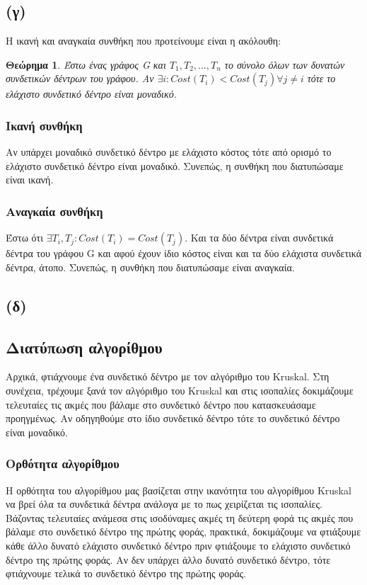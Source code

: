\documentclass[a4paper,oneside, 11pt]{article}
\newtheorem{theorem}{Θεώρημα}
\begin{document}
\subsection{(γ)}
Η ικανή και αναγκαία συνθήκη που προτείνουμε είναι η ακόλουθη:
\begin{theorem}
Έστω ένας γράφος G και $T_1, T_2, ..., T_n$ το σύνολο όλων των δυνατών συνδετικών δέντρων του γράφου. Αν 
$\exists i: Cost(T_i) < Cost(T_j) \forall j \neq i$ τότε το ελάχιστο συνδετικό δέντρο είναι μοναδικό.
\end{theorem}

\subsubsection{Ικανή συνθήκη}
Αν υπάρχει μοναδικό συνδετικό δέντρο με ελάχιστο κόστος τότε από ορισμό το ελάχιστο συνδετικό δέντρο είναι μοναδικό.  Συνεπώς, η συνθήκη που διατυπώσαμε είναι ικανή.

\subsubsection{Αναγκαία συνθήκη}
Έστω ότι $\exists T_i, T_j : Cost(T_i) = Cost(T_j)$. Και τα δύο δέντρα είναι συνδετικά δέντρα του γράφου G και αφού έχουν ίδιο κόστος είναι και τα δύο ελάχιστα συνδετικά δέντρα, άτοπο. Συνεπώς, η συνθήκη που διατυπώσαμε είναι αναγκαία.

\subsection{(δ)}
\subsection{Διατύπωση αλγορίθμου}
Αρχικά, φτιάχνουμε ένα συνδετικό δέντρο με τον αλγόριθμο του Kruskal. Στη συνέχεια, τρέχουμε ξανά τον αλγόριθμο του Kruskal και στις ισοπαλίες δοκιμάζουμε τελευταίες τις ακμές που βάλαμε στο συνδετικό δέντρο που κατασκευάσαμε προηγμένως. Αν οδηγηθούμε στο ίδιο συνδετικό δέντρο τότε το συνδετικό δέντρο είναι μοναδικό. 
\subsubsection{Ορθότητα αλγορίθμου}
Η ορθότητα του αλγορίθμου μας βασίζεται στην ικανότητα του αλγορίθμου Kruskal να βρεί όλα τα συνδετικά δέντρα ανάλογα με το πως χειρίζεται τις ισοπαλίες. Βάζοντας τελευταίες ανάμεσα στις ισοδύναμες ακμές τη δεύτερη φορά τις ακμές που βάλαμε στο συνδετικό δέντρο της πρώτης φοράς, πρακτικά, δοκιμάζουμε να φτιάξουμε κάθε άλλο δυνατό ελάχιστο συνδετικό δέντρο πριν φτιάξουμε το ελάχιστο συνδετικό δέντρο της πρώτης φοράς. Αν δεν υπάρχει άλλο δυνατό συνδετικό δέντρο, τότε φτιάχνουμε τελικά το συνδετικό δέντρο της πρώτης φοράς. \bigbreak 
\end{document}
